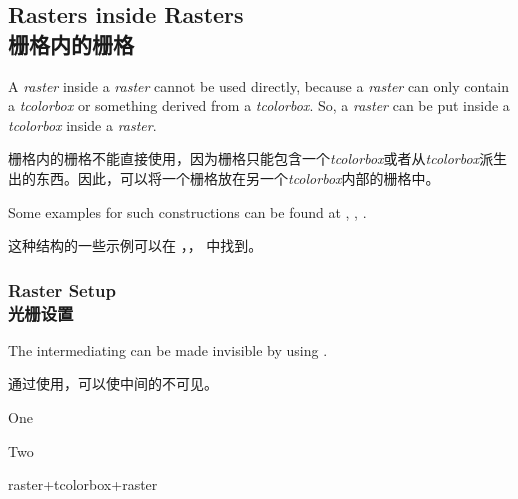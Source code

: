 
\subsection{Rasters inside Rasters\\栅格内的栅格}\label{subsec:raster_insideraster}

A \emph{raster} inside a \emph{raster} cannot be used directly, because
a \emph{raster} can only contain a \emph{tcolorbox} or something
derived from a \emph{tcolorbox}. So, a \emph{raster} can be put inside
a \emph{tcolorbox} inside a \emph{raster}.

栅格内的栅格不能直接使用，因为栅格只能包含一个\emph{tcolorbox}或者从\emph{tcolorbox}派生出的东西。因此，可以将一个栅格放在另一个\emph{tcolorbox}内部的栅格中。

Some examples for such constructions can be found at ,
,
.

这种结构的一些示例可以在 ，， 中找到。

\subsubsection{Raster Setup\\光栅设置}
The intermediating  can be made invisible by using
.

通过使用，可以使中间的不可见。
\begin{dispExample}
\begin{tcbraster}[raster equal height=rows,
raster every box/.style={colframe=red!50!black,colback=red!10!white}]
\begin{tcolorbox}[blankest]
\begin{tcbraster}[raster columns=1]
\begin{tcolorbox}One\end{tcolorbox}
\begin{tcolorbox}Two\end{tcolorbox}
\end{tcbraster}
\end{tcolorbox}
\begin{tcolorbox}raster+tcolorbox+raster\end{tcolorbox}
\end{tcbraster}
\end{dispExample}

